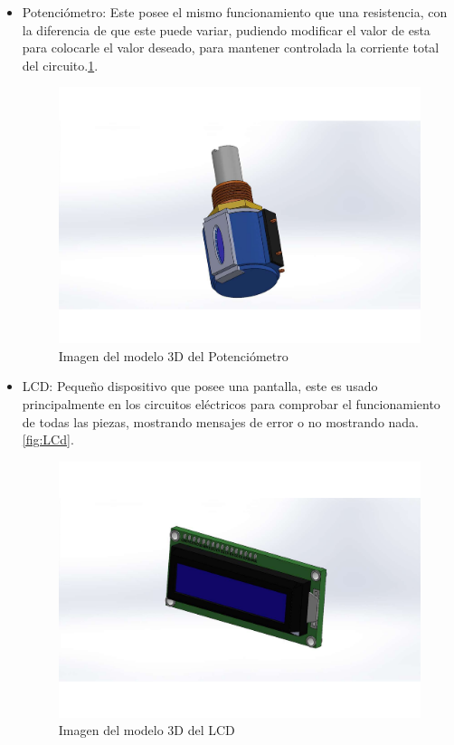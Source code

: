 \begin{itemize}
\begin{itemize}
    \item Potenciómetro: Este posee el mismo funcionamiento que una resistencia, con la diferencia de que este puede variar, pudiendo modificar el valor de esta para colocarle el valor deseado, para mantener controlada la corriente total del circuito.\ref{fig:Potenciómetro}.
    
            \begin{figure}[H]
        \centering
        \includegraphics[trim = {65mm 30mm 60mm 40mm},clip,scale=0.5]{19/Img/potenciometroFigura.pdf}
        \caption{Imagen del modelo 3D del Potenciómetro}
        \label{fig:Potenciómetro}
    \end{figure}
        
    \item LCD: Pequeño dispositivo que posee una pantalla, este es usado principalmente en los circuitos eléctricos para comprobar el funcionamiento de todas las piezas, mostrando mensajes de error o no mostrando nada.\ref{fig:LCd}.
    
            \begin{figure}[H]
        \centering
        \includegraphics[trim = {65mm 60mm 60mm 50mm},clip,scale=0.5]{19/Img/icdFigura.pdf}
        \caption{Imagen del modelo 3D del LCD}
        \label{fig:LCD}
    \end{figure}
    

\end{itemize}
\end{itemize}
